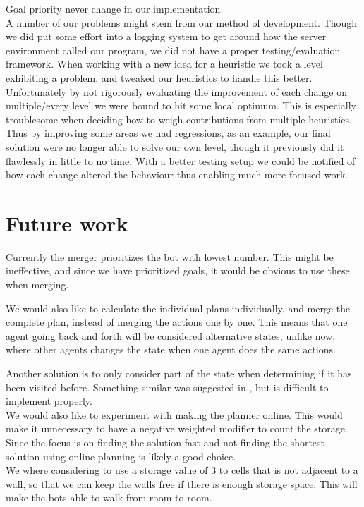 \documentclass[letterpaper]{article}
\begin{document}
Goal priority never change in our implementation.\\

A number of our problems might stem from our method of development.
Though we did put some effort into a logging system to get around how the server
environment called our program, we did not have a proper testing/evaluation
framework.
When working with a new idea for a heuristic we took a level exhibiting a
problem, and tweaked our heuristics to handle this better.
Unfortunately by not rigorously evaluating the improvement of each change on
multiple/every level we were bound to hit some local optimum. This is especially
troublesome when deciding how to weigh contributions from multiple heuristics.
Thus by improving some areas we had regressions, as an example, our final
solution were no longer able to solve our own level, though it previously did it
flawlessly in little to no time. With a better testing setup we could be notified of how
each change altered the behaviour thus enabling much more focused work.

\section{Future work}
Currently the merger prioritizes the bot with lowest number. This might be ineffective,
and since we have prioritized goals, it would be obvious to use these when merging.

We would also like to calculate the individual plans individually, and merge
the complete plan, instead of merging the actions one by one. This means that
one agent going back and forth will be considered alternative states, unlike now,
where other agents changes the state when one agent does the same actions.

Another solution is to only consider part of the state when determining if it has
been visited before. Something similar was suggested in \cite{sokobanMA}, but is difficult to implement
properly.\\

We would also like to experiment with making the planner online. This would make
it unnecessary to have a negative weighted modifier to count the storage. Since
the focus is on finding the solution fast and not finding the shortest solution
using online planning is likely a good choice.\\

We where considering to use a storage value of 3 to cells that is not adjacent to
a wall, so that we can keep the walls free if there is enough storage space.
This will make the bots able to walk from room to room.\\
\end{document}
